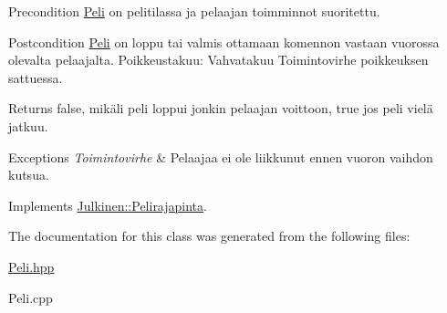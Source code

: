 \begin{DoxyPrecond}{Precondition}
\hyperlink{class_peli}{Peli} on pelitilassa ja pelaajan toimminnot suoritettu. 
\end{DoxyPrecond}
\begin{DoxyPostcond}{Postcondition}
\hyperlink{class_peli}{Peli} on loppu tai valmis ottamaan komennon vastaan vuorossa olevalta pelaajalta. Poikkeustakuu\+: Vahvatakuu Toimintovirhe poikkeuksen sattuessa.
\end{DoxyPostcond}
\begin{DoxyReturn}{Returns}
{\ttfamily false}, mikäli peli loppui jonkin pelaajan voittoon, {\ttfamily true} jos peli vielä jatkuu.
\end{DoxyReturn}

\begin{DoxyExceptions}{Exceptions}
{\em Toimintovirhe} & Pelaajaa ei ole liikkunut ennen vuoron vaihdon kutsua. \\
\hline
\end{DoxyExceptions}


Implements \hyperlink{class_julkinen_1_1_pelirajapinta_a873b4d57d698b82df131246df85c3193}{Julkinen\+::\+Pelirajapinta}.



The documentation for this class was generated from the following files\+:\begin{DoxyCompactItemize}
\item 
\hyperlink{_peli_8hpp}{Peli.\+hpp}\item 
Peli.\+cpp\end{DoxyCompactItemize}
